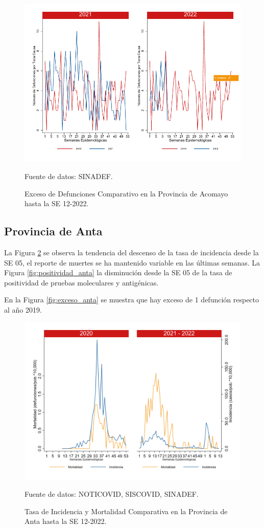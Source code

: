 \documentclass[12pt,a4paper,openany]{book}
\begin{document}
		\begin{figure}[h]
			\caption{Exceso de Defunciones Comparativo en la Provincia de Acomayo hasta la SE 12-2022.}\label{fig:exceso_acomayo}
			\begin{center}
				\includegraphics[width=0.7\linewidth]{../figuras/exceso_1.pdf}
			\end{center}
			{\footnotesize {Fuente de datos: SINADEF.}}
		\end{figure}
		
		\clearpage
		
		\subsection*{Provincia de Anta}
		\noindent La Figura \ref{fig:inc_mort_anta} se observa la tendencia del descenso de la tasa de incidencia desde la SE 05, el reporte de muertes se ha mantenido variable en las últimas semanas.
		\noindent La Figura
		\ref{fig:positividad_anta} la disminución desde la SE 05 de la tasa de positividad de pruebas moleculares y antigénicas. 
		
		En la Figura \ref{fig:exceso_anta} se muestra que hay exceso de 1 defunción respecto al año 2019.
		
		\begin{figure}[h]
			\caption{Tasa de Incidencia y Mortalidad Comparativa en la Provincia de Anta hasta la SE 12-2022.}\label{fig:inc_mort_anta}
			\begin{center}
				\includegraphics[width=0.85\linewidth]{../figuras/incidencia_mortalidad_20_21_2.png}
			\end{center}
			{\footnotesize {Fuente de datos: NOTICOVID, SISCOVID, SINADEF.}}
		\end{figure}
		
\end{document}
